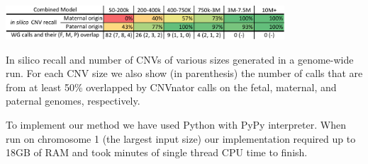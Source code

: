 \begin{table}
\centering
\includegraphics[width=0.78\textwidth]{figures/wg_calls_color}
\caption{In silico recall and number of CNVs of various sizes generated in a genome-wide run. For each CNV size we also show (in parenthesis) the number of calls that are from at least 50\% overlapped by CNVnator \cite{abyzov2011cnvnator} calls on the fetal, maternal, and paternal genomes, respectively.}
\label{tab:resWGS} 
\end{table}
\vspace{1cm}

To implement our method we have used Python with PyPy interpreter. When run on chromosome 1 (the largest input size) our implementation required up to 18GB of RAM and took  minutes of single thread CPU time to finish.
